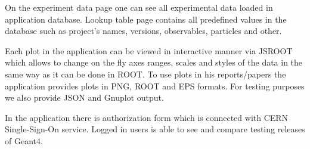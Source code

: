 On the experiment data page one can see all experimental data loaded in application database.
Lookup table page contains all predefined values in the database such as project's names, versions, observables, particles and other.

Each plot in the application can be viewed in interactive manner via JSROOT~\cite{JSROOT} which allows to change on the fly axes ranges, scales and styles of the data in the same way as it can be done in ROOT. To use plots in his reports/papers the application provides plots in PNG, ROOT and EPS formats. For testing purposes we also provide JSON and Gnuplot output.

In the application there is authorization form which is connected with CERN Single-Sign-On service. Logged in users is able to see and compare testing releases of Geant4.





